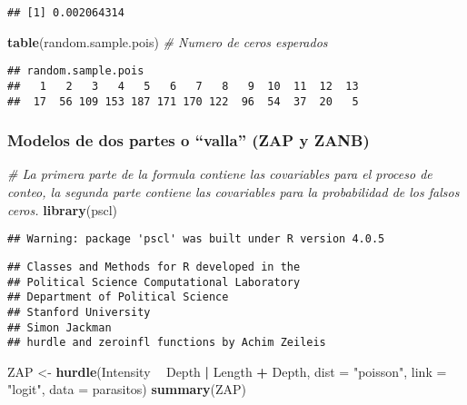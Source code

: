 \documentclass[
]{book}
\newenvironment{Shaded}{\begin{snugshade}}{\end{snugshade}}
\newcommand{\CommentTok}[1]{\textcolor[rgb]{0.56,0.35,0.01}{\textit{#1}}}
\newcommand{\DataTypeTok}[1]{\textcolor[rgb]{0.13,0.29,0.53}{#1}}
\newcommand{\KeywordTok}[1]{\textcolor[rgb]{0.13,0.29,0.53}{\textbf{#1}}}
\newcommand{\NormalTok}[1]{#1}
\newcommand{\OperatorTok}[1]{\textcolor[rgb]{0.81,0.36,0.00}{\textbf{#1}}}
\newcommand{\StringTok}[1]{\textcolor[rgb]{0.31,0.60,0.02}{#1}}
\begin{document}
\begin{verbatim}
## [1] 0.002064314
\end{verbatim}

\begin{Shaded}
\begin{Highlighting}[]
\KeywordTok{table}\NormalTok{(random.sample.pois) }\CommentTok{# Numero de ceros esperados}
\end{Highlighting}
\end{Shaded}

\begin{verbatim}
## random.sample.pois
##   1   2   3   4   5   6   7   8   9  10  11  12  13 
##  17  56 109 153 187 171 170 122  96  54  37  20   5
\end{verbatim}

\hypertarget{modelos-de-dos-partes-o-valla-zap-y-zanb}{%
\subsubsection{Modelos de dos partes o ``valla'' (ZAP y ZANB)}\label{modelos-de-dos-partes-o-valla-zap-y-zanb}}

\begin{Shaded}
\begin{Highlighting}[]
\CommentTok{# La primera parte de la formula contiene las covariables para el proceso de conteo, la segunda parte contiene las covariables para la probabilidad de los falsos ceros.}
\KeywordTok{library}\NormalTok{(pscl)}
\end{Highlighting}
\end{Shaded}

\begin{verbatim}
## Warning: package 'pscl' was built under R version 4.0.5
\end{verbatim}

\begin{verbatim}
## Classes and Methods for R developed in the
## Political Science Computational Laboratory
## Department of Political Science
## Stanford University
## Simon Jackman
## hurdle and zeroinfl functions by Achim Zeileis
\end{verbatim}

\begin{Shaded}
\begin{Highlighting}[]
\NormalTok{ZAP <-}\StringTok{ }\KeywordTok{hurdle}\NormalTok{(Intensity }\OperatorTok{~}\StringTok{ }\NormalTok{Depth }\OperatorTok{|}\StringTok{ }\NormalTok{Length }\OperatorTok{+}\StringTok{ }\NormalTok{Depth, }\DataTypeTok{dist =} \StringTok{"poisson"}\NormalTok{, }
\DataTypeTok{link =} \StringTok{"logit"}\NormalTok{, }\DataTypeTok{data =}\NormalTok{ parasitos)}
\KeywordTok{summary}\NormalTok{(ZAP)}
\end{Highlighting}
\end{Shaded}
\end{document}
